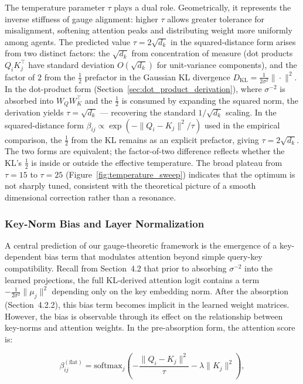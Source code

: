 \documentclass[twoside,11pt]{article}
\begin{document}
The temperature parameter $\tau$ plays a dual role. Geometrically, it represents the inverse stiffness of gauge alignment: higher $\tau$ allows greater tolerance for misalignment, softening attention peaks and distributing weight more uniformly among agents. The predicted value $\tau = 2\sqrt{d_k}$ in the squared-distance form arises from two distinct factors: the $\sqrt{d_k}$ from concentration of measure (dot products $Q_i K_j^\top$ have standard deviation $O(\sqrt{d_k})$ for unit-variance components), and the factor of $2$ from the $\frac{1}{2}$ prefactor in the Gaussian KL divergence $D_{\mathrm{KL}} = \frac{1}{2\sigma^2}\|\cdot\|^2$. In the dot-product form (Section~\ref{sec:dot_product_derivation}), where $\sigma^{-2}$ is absorbed into $W_Q W_K^\top$ and the $\frac{1}{2}$ is consumed by expanding the squared norm, the derivation yields $\tau = \sqrt{d_k}$ --- recovering the standard $1/\sqrt{d_k}$ scaling. In the squared-distance form $\beta_{ij} \propto \exp(-\|Q_i - K_j\|^2/\tau)$ used in the empirical comparison, the $\frac{1}{2}$ from the KL remains as an explicit prefactor, giving $\tau = 2\sqrt{d_k}$. The two forms are equivalent; the factor-of-two difference reflects whether the KL's $\frac{1}{2}$ is inside or outside the effective temperature. The broad plateau from $\tau = 15$ to $\tau = 25$ (Figure~\ref{fig:temperature_sweep}) indicates that the optimum is not sharply tuned, consistent with the theoretical picture of a smooth dimensional correction rather than a resonance.


\subsubsection{Key-Norm Bias and Layer Normalization}

A central prediction of our gauge-theoretic framework is the emergence of a key-dependent bias term that modulates attention beyond simple query-key compatibility. Recall from Section~4.2 that prior to absorbing $\sigma^{-2}$ into the learned projections, the full KL-derived attention logit contains a term $-\frac{1}{2\sigma^2}\|\mu_j\|^2$ depending only on the key embedding norm. After the absorption (Section~4.2.2), this bias term becomes implicit in the learned weight matrices. However, the bias is observable through its effect on the relationship between key-norms and attention weights. In the pre-absorption form, the attention score is:

\begin{equation}
\beta_{ij}^{(\text{flat})} = \text{softmax}_j\left( -\frac{\|Q_i - K_j\|^2}{\tau} - \lambda\|K_j\|^2 \right),
\end{equation}
\end{document}
